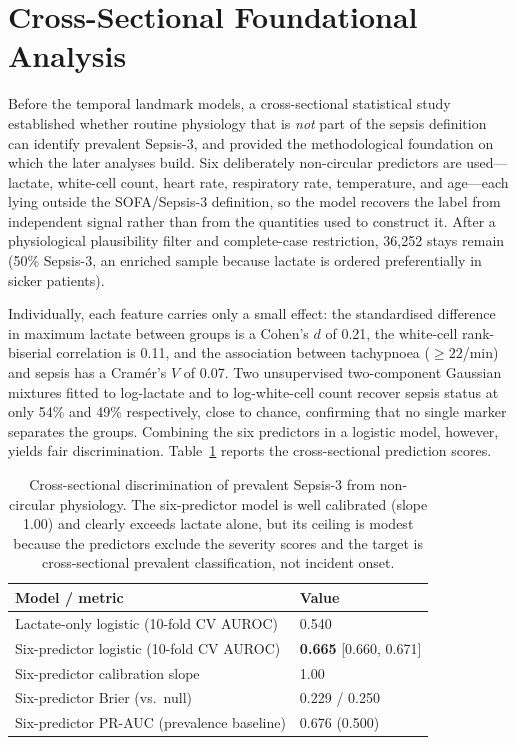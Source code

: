 \section{Cross-Sectional Foundational Analysis}
\label{sec:cross_sectional}

Before the temporal landmark models, a cross-sectional statistical study
established whether routine physiology that is \emph{not} part of the sepsis
definition can identify prevalent Sepsis-3, and provided the methodological
foundation on which the later analyses build. Six deliberately non-circular
predictors are used---lactate, white-cell count, heart rate, respiratory rate,
temperature, and age---each lying outside the SOFA/Sepsis-3 definition, so the
model recovers the label from independent signal rather than from the
quantities used to construct it. After a physiological plausibility filter and
complete-case restriction, 36{,}252 stays remain (50\% Sepsis-3, an enriched
sample because lactate is ordered preferentially in sicker patients).

Individually, each feature carries only a small effect: the standardised
difference in maximum lactate between groups is a Cohen's $d$ of 0.21, the
white-cell rank-biserial correlation is 0.11, and the association between
tachypnoea ($\ge 22$/min) and sepsis has a Cram\'er's $V$ of 0.07. Two
unsupervised two-component Gaussian mixtures fitted to log-lactate and to
log-white-cell count recover sepsis status at only 54\% and 49\% respectively,
close to chance, confirming that no single marker separates the groups.
Combining the six predictors in a logistic model, however, yields fair
discrimination. Table~\ref{table:cross_sectional} reports the cross-sectional
prediction scores.

\begin{table}[H]
    \centering
    \begin{tabular}{p{7.5cm}|p{4.5cm}}
        \hline
        \textbf{Model / metric} & \textbf{Value} \\
        \hline\hline
        Lactate-only logistic (10-fold CV AUROC)      & 0.540 \\
        Six-predictor logistic (10-fold CV AUROC)     & \textbf{0.665} [0.660, 0.671] \\
        Six-predictor calibration slope               & 1.00 \\
        Six-predictor Brier (vs.\ null)               & 0.229 / 0.250 \\
        Six-predictor PR-AUC (prevalence baseline)    & 0.676 (0.500) \\
        \hline
    \end{tabular}
    \caption{Cross-sectional discrimination of prevalent Sepsis-3 from
    non-circular physiology. The six-predictor model is well calibrated
    (slope 1.00) and clearly exceeds lactate alone, but its ceiling is modest
    because the predictors exclude the severity scores and the target is
    cross-sectional prevalent classification, not incident onset.}
    \label{table:cross_sectional}
\end{table}

